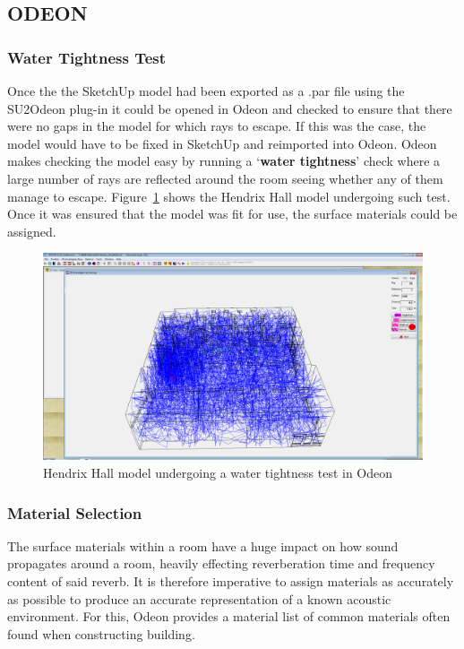\documentclass[../../main.tex]{subfiles}
\begin{document}
\subsection{ODEON}
	\label{odeon}
	\subsubsection{Water Tightness Test}
		Once the the SketchUp model had been exported as a .par file using the SU2Odeon plug-in \cite{SU2Odeon} it could be opened in Odeon and checked to ensure that there were no gaps in the model for which rays to escape. If this was the case, the model would have to be fixed in SketchUp and reimported into Odeon. Odeon makes checking the model easy by running a `\textbf{water tightness}' check where a large number of rays are reflected around the room seeing whether any of them manage to escape. Figure~\ref{watertight} shows the Hendrix Hall model undergoing such test. Once it was ensured that the model was fit for use, the surface materials could be assigned.

		\begin{figure}[ht]
			\center\includegraphics[scale = 0.3]{Sections/Implementation/Odeon/images/OdeonRays/waterTight2.PNG}
			\caption{Hendrix Hall model undergoing a water tightness test in Odeon}
			\label{watertight}
		\end{figure}

	\subsubsection{Material Selection}
	\label{odeon:materials}
		The surface materials within a room have a huge impact on how sound propagates around a room, heavily effecting reverberation time and frequency content of said reverb. It is therefore imperative to assign materials as accurately as possible to produce an accurate representation of a known acoustic environment. For this, Odeon provides a material list of common materials often found when constructing building.
\end{document}
